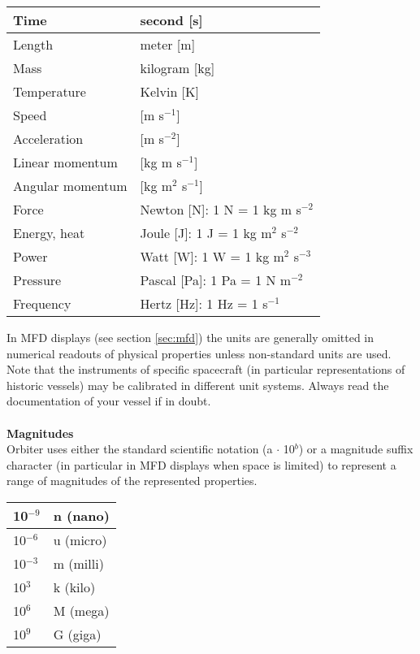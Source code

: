 \documentclass[Orbiter User Manual.tex]{subfiles}
\begin{document}
	\begin{longtable}{ |p{}|p{}| }
	\hline\rule{0pt}{2ex}
	Time & second [s]\\
	\hline\rule{0pt}{2ex}
	Length & meter [m]\\
	\hline\rule{0pt}{2ex}
	Mass & kilogram [kg]\\
	\hline\rule{0pt}{2ex}
	Temperature & Kelvin [K]\\
	\hline\rule{0pt}{2ex}
	Speed & [m s$^{-1}$]\\
	\hline\rule{0pt}{2ex}
	Acceleration & [m s$^{-2}$]\\
	\hline\rule{0pt}{2ex}
	Linear momentum & [kg m s$^{-1}$]\\
	\hline\rule{0pt}{2ex}
	Angular momentum & [kg m$^{2}$ s$^{-1}$]\\
	\hline\rule{0pt}{2ex}
	Force & Newton [N]: 1 N = 1 kg m s$^{-2}$\\
	\hline\rule{0pt}{2ex}
	Energy, heat & Joule [J]: 1 J = 1 kg m$^{2}$ s$^{-2}$\\
	\hline\rule{0pt}{2ex}
	Power & Watt [W]: 1 W = 1 kg m$^{2}$ s$^{-3}$\\
	\hline\rule{0pt}{2ex}
	Pressure & Pascal [Pa]: 1 Pa = 1 N m$^{-2}$\\
	\hline\rule{0pt}{2ex}
	Frequency & Hertz [Hz]: 1 Hz = 1 s$^{-1}$\\
	\hline
	\end{longtable}

\noindent
In MFD displays (see section \ref{sec:mfd}) the units are generally omitted in numerical readouts of physical properties unless non-standard units are used.\\
Note that the instruments of specific spacecraft (in particular representations of historic vessels) may be calibrated in different unit systems. Always read the documentation of your vessel if in doubt.\\
\\
\textbf{Magnitudes}\\
Orbiter uses either the standard scientific notation (a $\cdot$ 10$^{b}$) or a magnitude suffix character (in particular in MFD displays when space is limited) to represent a range of magnitudes of the represented properties.

	\begin{longtable}{ |p{}|p{}| }
	\hline\rule{0pt}{2ex}
	10$^{-9}$ & n (nano)\\
	\hline\rule{0pt}{2ex}
	10$^{-6}$ & u (micro)\\
	\hline\rule{0pt}{2ex}
	10$^{-3}$ & m (milli)\\
	\hline\rule{0pt}{2ex}
	10$^{3}$ & k (kilo)\\
	\hline\rule{0pt}{2ex}
	10$^{6}$ & M (mega)\\
	\hline\rule{0pt}{2ex}
	10$^{9}$ & G (giga)\\
	\hline
	\end{longtable}
\end{document}
